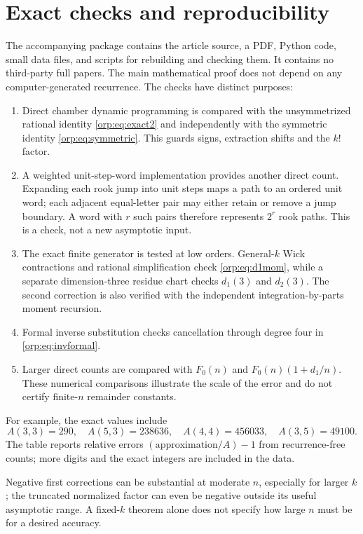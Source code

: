 \documentclass[11pt]{article}
\theoremstyle{remark}\newtheorem{remark}[theorem]{Remark}
\begin{document}
\section{Exact checks and reproducibility}\label{orp:sec:checks}
The accompanying package contains the article source, a PDF, Python code, small data files, and scripts for rebuilding and checking them. It contains no third-party full papers. The main mathematical proof does not depend on any computer-generated recurrence. The checks have distinct purposes:
\begin{enumerate}[label=\arabic*.]
\item Direct chamber dynamic programming is compared with the unsymmetrized rational identity \eqref{orp:eq:exact2} and independently with the symmetric identity \eqref{orp:eq:symmetric}. This guards signs, extraction shifts and the $k!$ factor.
\item A weighted unit-step-word implementation provides another direct count. Expanding each rook jump into unit steps maps a path to an ordered unit word; each adjacent equal-letter pair may either retain or remove a jump boundary. A word with $r$ such pairs therefore represents $2^r$ rook paths. This is a check, not a new asymptotic input.
\item The exact finite generator is tested at low orders. General-$k$ Wick contractions and rational simplification check \eqref{orp:eq:d1mom}, while a separate dimension-three residue chart checks $d_1(3)$ and $d_2(3)$. The second correction is also verified with the independent integration-by-parts moment recursion.
\item Formal inverse substitution checks cancellation through degree four in \eqref{orp:eq:invformal}.
\item Larger direct counts are compared with $F_0(n)$ and $F_0(n)(1+d_1/n)$. These numerical comparisons illustrate the scale of the error and do not certify finite-$n$ remainder constants.
\end{enumerate}
For example, the exact values include
\[
 A(3,3)=290,\quad A(5,3)=238636,\quad A(4,4)=456033,\quad A(3,5)=49100.
\]
The table reports relative errors $(\text{approximation}/A)-1$ from recurrence-free counts; more digits and the exact integers are included in the data.
\begin{center}

\end{center}
Negative first corrections can be substantial at moderate $n$, especially for larger $k$; the truncated normalized factor can even be negative outside its useful asymptotic range. A fixed-$k$ theorem alone does not specify how large $n$ must be for a desired accuracy.
\end{document}
